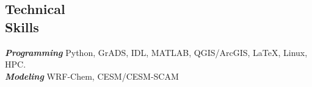 \documentclass[margin,line]{resume}
\begin{document}
\begin{resume}
		
		
		\vspace{-0.4cm}
		\section{\mysidestyle \textbf{\textcolor{sep}{Technical \\Skills}}}
		
		\textbf{\emph{\textcolor{sep}{Programming}}} \hspace{1mm} Python, GrADS, IDL, MATLAB, QGIS/ArcGIS,  \LaTeX, Linux, HPC.\\
		\textbf{\emph{\textcolor{sep}{Modeling}}} \hspace{8mm} WRF-Chem, CESM/CESM-SCAM  
		

\end{resume}
\end{document}
